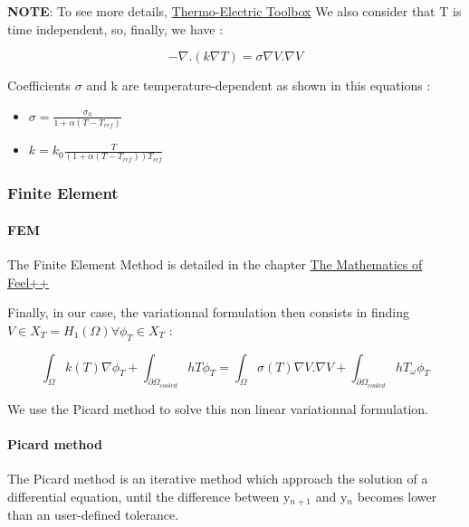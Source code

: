 \documentclass[11pt]{amsart}
\newcommand{\admonition}[2]{\textbf{#1}: {#2}}
\begin{document}
\admonition{NOTE}{To see more details, \href{http://book.feelpp.org/toolbox/thermoelectric}{Thermo-Electric Toolbox}}
We also consider that T is time independent, so, finally, we have :



\[
- \nabla.(k \nabla T)=\sigma\nabla V . \nabla V
\]



Coefficients $\sigma$ and k are temperature-dependent as shown in this equations :


\begin{itemize}

\item $\sigma=\frac{\sigma_ {0}}{1 + \alpha(T-T_{ref})}$

\item $k=k_{0}\frac{T}{(1+\alpha(T-T_{ref}))T_{ref}}$

\end{itemize}


\hypertarget{x-finite-element}{\subsubsection{Finite Element}}
\hypertarget{x-fem}{\paragraph{FEM}}
The Finite Element Method is detailed in the chapter \href{http://book.feelpp.org/math/fem#cha:appr-r-probl-1}{The Mathematics of Feel++}


Finally, in our case, the variationnal formulation then consists in finding $V\in X_{T}=H_{1}(\Omega)   \forall \phi_{T}\in X_{T}$  :



\[
\int_{\Omega}k(T)\nabla\phi_{T} + \int_{\partial\Omega_{cooled}}hT\phi_{T}=\int_{\Omega}\sigma(T)\nabla V. \nabla V +\int_{\partial\Omega_{cooled}}hT_{\omega}\phi_{T}
\]



We use the Picard method to solve this non linear variationnal formulation.


\hypertarget{x-picard-method}{\paragraph{Picard method}}
The Picard method is an iterative method which approach the solution of a differential equation, until the difference between y${}_{n+1}$ and y${}_{n}$ becomes lower than an user-defined tolerance.
\end{document}
